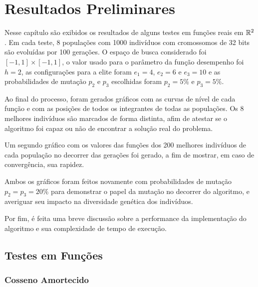 \chapter{Resultados Preliminares}\label{cap_resultados}

Nesse capítulo são exibidos os resultados de alguns testes em funções reais em $\mathbb{R}^2$. Em cada teste, 
8 populações com 1000 indivíduos com cromossomos de 32 bits são evoluídas por 100 gerações. O espaço de busca
considerado foi $ [-1,1] \times [-1, 1] $, o valor usado para o parâmetro da função desempenho foi $h = 2$,
as configurações para a elite foram $e_1 = 4$, $e_2 = 6$ e $e_3 = 10$ e as probabilidades de mutação $p_2$ e $p_3$ escolhidas
foram $p_2 = 5\%$ e $p_3 = 5\%$.

Ao final do processo,
foram gerados gráficos com as curvas de nível de cada função e com as posições de todos os
integrantes de todas as populações. Os 8 melhores indivíduos são marcados de forma distinta,
afim de atestar se o algoritmo foi capaz ou não de encontrar a solução real do problema.

Um segundo gráfico com os valores das funções dos 200 melhores indivíduos de cada população
no decorrer das gerações foi gerado, a fim de mostrar, em caso de convergência, sua rapidez.

Ambos os gráficos foram feitos novamente com probabilidades de mutação $p_2 = p_3 = 20\%$
para demonstrar o papel da mutação no decorrer do algoritmo, e averiguar seu impacto na diversidade genética
dos indivíduos.

Por fim, é feita uma breve discussão sobre a performance da implementação do algoritmo e sua
complexidade de tempo de execução.

\section{Testes em Funções}

\subsection{Cosseno Amortecido}

